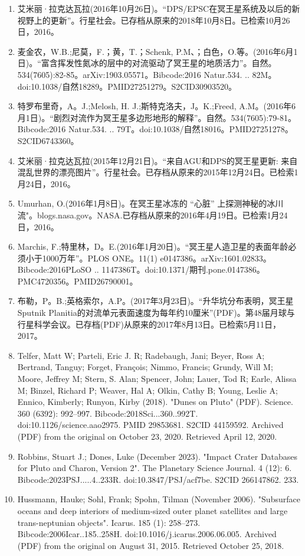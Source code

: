 \begin{enumerate}
\item 艾米丽·拉克达瓦拉(2016年10月26日)。“DPS/EPSC在冥王星系统及以后的新视野上的更新”。行星社会。已存档从原来的2018年10月8日。已检索10月26日，2016。
\item 麦金农，W.B.;尼莫，F.；黄，T.；Schenk, P.M、；白色，O.等。(2016年6月1日)。“富含挥发性氮冰的层中的对流驱动了冥王星的地质活力”。自然。534(7605):82-85。arXiv:1903.05571。Bibcode:2016 Natur.534. .. 82M。doi:10.1038/自然18289。PMID27251279。S2CID30903520。  
\item 特罗布里奇，A。J.;Melosh, H. J.;斯特克洛夫，J。K.;Freed, A.M。(2016年6月1日)。“剧烈对流作为冥王星多边形地形的解释”。自然。534(7605):79-81。Bibcode:2016 Natur.534. .. 79T。doi:10.1038/自然18016。PMID27251278。S2CID6743360。  
\item 艾米丽·拉克达瓦拉(2015年12月21日)。“来自AGU和DPS的冥王星更新: 来自混乱世界的漂亮图片”。行星社会。已存档从原来的2015年12月24日。已检索1月24日，2016。
\item Umurhan, O.(2016年1月8日)。在冥王星冰冻的 “心脏” 上探测神秘的冰川流"。blogs.nasa.gov。NASA.已存档从原来的2016年4月19日。已检索1月24日，2016。
\item Marchis, F.;特里林，D。E.(2016年1月20日)。“冥王星人造卫星的表面年龄必须小于1000万年”。PLOS ONE。11(1) e0147386。arXiv:1601.02833。Bibcode:2016PLoSO .. 1147386T。doi:10.1371/期刊.pone.0147386。PMC4720356。PMID26790001。  
\item 布勒，P。B.;英格索尔，A.P。(2017年3月23日)。“升华坑分布表明，冥王星Sputnik Planitia的对流单元表面速度为每年约10厘米”(PDF)。第48届月球与行星科学会议。已存档(PDF)从原来的2017年8月13日。已检索5月11日，2017。
\item Telfer, Matt W; Parteli, Eric J. R; Radebaugh, Jani; Beyer, Ross A; Bertrand, Tanguy; Forget, François; Nimmo, Francis; Grundy, Will M; Moore, Jeffrey M; Stern, S. Alan; Spencer, John; Lauer, Tod R; Earle, Alissa M; Binzel, Richard P; Weaver, Hal A; Olkin, Cathy B; Young, Leslie A; Ennico, Kimberly; Runyon, Kirby (2018). "Dunes on Pluto" (PDF). Science. 360 (6392): 992–997. Bibcode:2018Sci...360..992T. doi:10.1126/science.aao2975. PMID 29853681. S2CID 44159592. Archived (PDF) from the original on October 23, 2020. Retrieved April 12, 2020.
\item Robbins, Stuart J.; Dones, Luke (December 2023). "Impact Crater Databases for Pluto and Charon, Version 2". The Planetary Science Journal. 4 (12): 6. Bibcode:2023PSJ.....4..233R. doi:10.3847/PSJ/acf7be. S2CID 266147862. 233.
\item Hussmann, Hauke; Sohl, Frank; Spohn, Tilman (November 2006). "Subsurface oceans and deep interiors of medium-sized outer planet satellites and large trans-neptunian objects". Icarus. 185 (1): 258–273. Bibcode:2006Icar..185..258H. doi:10.1016/j.icarus.2006.06.005. Archived (PDF) from the original on August 31, 2015. Retrieved October 25, 2018.

\end{enumerate}
